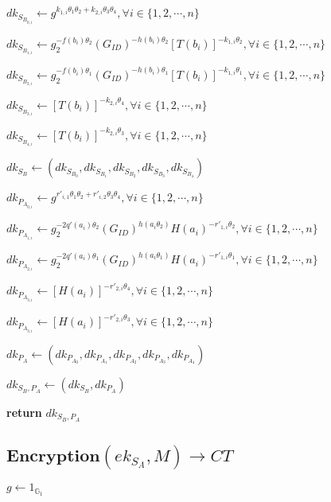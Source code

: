 \documentclass[a4paper]{article}
\begin{document}
$\textit{dk}_{S_{B_{0, i}}} \gets g^{k_{1, i} \theta_1 \theta_2 + k_{2, i} \theta_3 \theta_4}, \forall i \in \{1, 2, \cdots, n\}$

$\textit{dk}_{S_{B_{1, i}}} \gets g_2^{-f(b_i) \theta_2} (G_{\textit{ID}})^{-h(b_i) \theta_2} [T(b_i)]^{-k_{1, i} \theta_2}, \forall i \in \{1, 2, \cdots, n\}$

$\textit{dk}_{S_{B_{2, i}}} \gets g_2^{-f(b_i) \theta_1} (G_{\textit{ID}})^{-h(b_i) \theta_1} [T(b_i)]^{-k_{1, i} \theta_1}, \forall i \in \{1, 2, \cdots, n\}$

$\textit{dk}_{S_{B_{3, i}}} \gets [T(b_i)]^{-k_{2, i} \theta_4}, \forall i \in \{1, 2, \cdots, n\}$

$\textit{dk}_{S_{B_{4, i}}} \gets [T(b_i)]^{-k_{2, i} \theta_3}, \forall i \in \{1, 2, \cdots, n\}$

$\textit{dk}_{S_B} \gets (\textit{dk}_{S_{B_0}}, \textit{dk}_{S_{B_1}}, \textit{dk}_{S_{B_2}}, \textit{dk}_{S_{B_3}}, \textit{dk}_{S_{B_4}})$

$\textit{dk}_{P_{A_{0, i}}} \gets g^{r'_{i, 1} \theta_1 \theta_2 + r'_{i, 2} \theta_3 \theta_4}, \forall i \in \{1, 2, \cdots, n\}$

$\textit{dk}_{P_{A_{1, i}}} \gets g_2^{-2q'(a_i) \theta_2} (G_{\textit{ID}})^{h(a_i \theta_2)} H(a_i)^{-r'_{1, i} \theta_2}, \forall i \in \{1, 2, \cdots, n\}$

$\textit{dk}_{P_{A_{2, i}}} \gets g_2^{-2q'(a_i) \theta_1} (G_{\textit{ID}})^{h(a_i \theta_1)} H(a_i)^{-r'_{1, i} \theta_1}, \forall i \in \{1, 2, \cdots, n\}$

$\textit{dk}_{P_{A_{3, i}}} \gets [H(a_i)]^{-r'_{2, i} \theta_4}, \forall i \in \{1, 2, \cdots, n\}$

$\textit{dk}_{P_{A_{3, i}}} \gets [H(a_i)]^{-r'_{2, i} \theta_3}, \forall i \in \{1, 2, \cdots, n\}$

$\textit{dk}_{P_A} \gets (\textit{dk}_{P_{A_0}}, \textit{dk}_{P_{A_1}}, \textit{dk}_{P_{A_2}}, \textit{dk}_{P_{A_3}}, \textit{dk}_{P_{A_4}})$

$\textit{dk}_{S_B, P_A} \gets (\textit{dk}_{S_B}, \textit{dk}_{P_A})$

\textbf{return} $\textit{dk}_{S_B, P_A}$

\subsection{$\textbf{Encryption}(\textit{ek}_{S_A}, M) \rightarrow \textit{CT}$}

$g \gets 1_{\mathbb{G}_1}$
\end{document}

